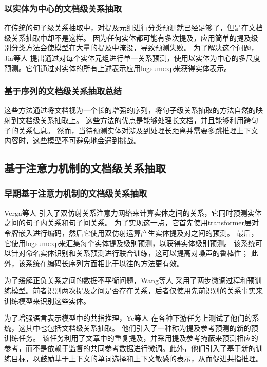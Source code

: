 \documentclass[bachelor]{thesis-uestc}
\begin{document}
\subsubsection{以实体为中心的文档级关系抽取}
在传统的句子级关系抽取中，对提及元组进行分类预测就已经足够了，但是在文档级关系抽取中却不是这样。
因为任何实体都可能有多次提及，应用简单的提及级别分类方法会使模型在大量的提及中淹没，导致预测失败。
为了解决这个问题，Jia等人 \cite{jia-etal-2019-document} 提出通过对每个实体元组进行单一关系预测，使用以实体为中心的多尺度预测。它们通过对实体的所有上述表示应用logsumexp来获得实体表示。

\subsubsection{基于序列的文档级关系抽取总结}
这些方法通过将文档视为一个长的增强的序列，将句子级关系抽取的方法自然的映射到文档级关系抽取上。
这些方法的优点是能够处理长文档，并且能够利用跨句子的关系信息。
然而，当待预测实体对涉及到处理长距离并需要多跳推理上下文内容时，这些模型不可避免地会遇到挑战。

\subsection{基于注意力机制的文档级关系抽取}

\subsubsection{早期基于注意力机制的文档级关系抽取}
Verga等人\cite{verga-etal-2018-simultaneously} 引入了双仿射关系注意力网络来计算实体之间的关系，它同时预测实体之间的句子内关系和句子间关系。
为了实现这一点，它首先使用transformer层对令牌嵌入进行编码，然后它使用双仿射运算产生实体提及对之间的预测。
最后，它使用logsumexp来汇集每个实体提及级别预测，以获得实体级别预测。
该系统可以针对命名实体识别和关系预测进行联合训练，这可以提高对噪声的鲁棒性； 此外，该系统在编码长序列方面相比于以往的方法更有效。\par

为了缓解正负关系之间的数据不平衡问题，Wang等人\cite{corr} 采用了两步微调过程和预训练模型。前者识别两次提及之间是否存在关系，后者仅使用先前识别的关系事实来训练模型来识别这些实体。\par
为了增强语言表示模型中的共指推理，Ye等人 \cite{y2020-coreferential}在各种下游任务上测试了他们的系统，这其中也包括文档级关系抽取。
他们引入了一种称为提及参考预测的新的预训练任务。
该任务利用了文章中的重复提及，并采用提及参考掩蔽来预测相应的参考，而不是依赖于监督的共同参考数据进行微调。此外，他们引入了基于新的训练目标，以鼓励基于上下文的单词选择和上下文敏感的表示，从而促进共指推理。
\end{document}
